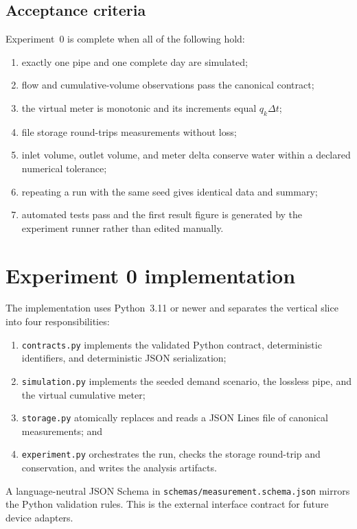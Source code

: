 \documentclass[11pt,a4paper]{article}
\begin{document}
\subsection{Acceptance criteria}
Experiment~0 is complete when all of the following hold:
\begin{enumerate}
  \item exactly one pipe and one complete day are simulated;
  \item flow and cumulative-volume observations pass the canonical contract;
  \item the virtual meter is monotonic and its increments equal
        $q_k\Delta t$;
  \item file storage round-trips measurements without loss;
  \item inlet volume, outlet volume, and meter delta conserve water within a
        declared numerical tolerance;
  \item repeating a run with the same seed gives identical data and summary;
  \item automated tests pass and the first result figure is generated by the
        experiment runner rather than edited manually.
\end{enumerate}

\section{Experiment 0 implementation}
The implementation uses Python~3.11 or newer and separates the vertical slice
into four responsibilities:
\begin{enumerate}
  \item \texttt{contracts.py} implements the validated Python contract,
        deterministic identifiers, and deterministic JSON serialization;
  \item \texttt{simulation.py} implements the seeded demand scenario, the
        lossless pipe, and the virtual cumulative meter;
  \item \texttt{storage.py} atomically replaces and reads a JSON Lines file of
        canonical measurements; and
  \item \texttt{experiment.py} orchestrates the run, checks the storage
        round-trip and conservation, and writes the analysis artifacts.
\end{enumerate}
A language-neutral JSON Schema in \texttt{schemas/measurement.schema.json}
mirrors the Python validation rules. This is the external interface contract
for future device adapters.
\end{document}
